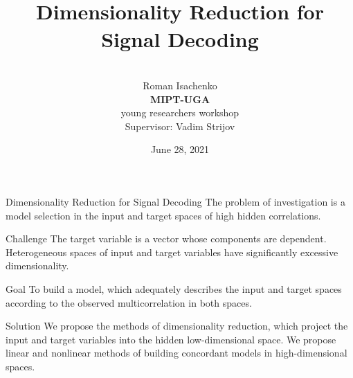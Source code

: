 \documentclass[10pt]{beamer}
\title[\hbox to 56mm{  \hfill\insertframenumber\,/\,\inserttotalframenumber}]
{\\ 
\vspace{1cm}
Dimensionality Reduction for Signal Decoding }
\author[Roman Isachenko]{\\ 
	Roman Isachenko \\
	\vspace{0.5cm}
	\textbf{MIPT-UGA} \\ 
	young researchers workshop \\
	\vspace{0.5cm}
	Supervisor: Vadim Strijov
	}
\date{June 28, 2021}
\begin{document}
\begin{frame}
\titlepage
\end{frame}
\begin{frame}{Dimensionality Reduction for Signal Decoding}
	The problem of investigation is a model selection in the input and target spaces of high hidden correlations.
	\begin{block}{Challenge}
		The target variable is a vector whose components are dependent.
		Heterogeneous spaces of input and target variables have significantly excessive dimensionality.
	\end{block}
	
	\begin{block}{Goal}
		To build a model, which adequately describes the input and target spaces according to the observed multicorrelation in both spaces.
	\end{block}
	
	\begin{block}{Solution}
		We propose the methods of dimensionality reduction, which project the input and target variables into the hidden low-dimensional space. 
		We propose linear and nonlinear methods of building concordant models in high-dimensional spaces.
	\end{block}
\end{frame}
\end{document}
